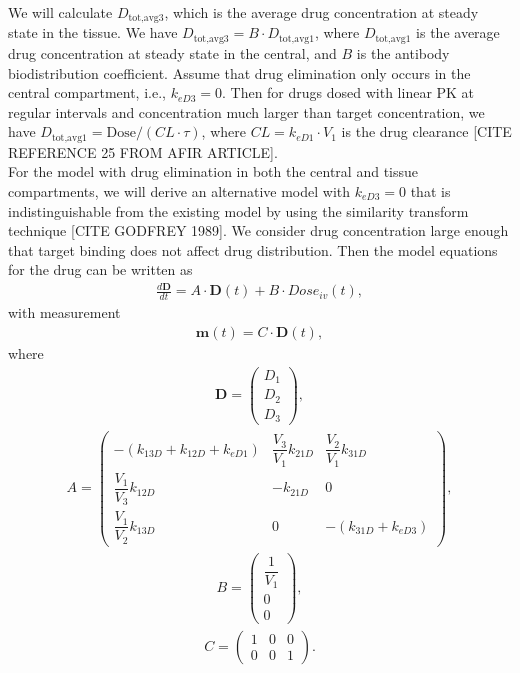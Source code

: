 We will calculate $D_{\text{tot,avg}3}$, which is the average drug concentration at steady state in the tissue. We have $D_{\text{tot,avg}3} = B \cdot D_{\text{tot,avg}1}$, where $D_{\text{tot,avg}1}$ is the average drug concentration at steady state in the central, and $B$ is the antibody biodistribution coefficient. Assume that drug elimination only occurs in the central compartment, i.e., $k_{eD3} = 0$. Then for drugs dosed with linear PK at regular intervals and concentration much larger than target concentration, we have $D_{\text{tot,avg}1} = \text{Dose}/(CL \cdot \tau)$, where $CL = k_{eD1} \cdot V_1$ is the drug clearance [CITE REFERENCE 25 FROM AFIR ARTICLE]. \\

For the model with drug elimination in both the central and tissue compartments, we will derive an alternative model with $k_{eD3} = 0$ that is indistinguishable from the existing model by using the similarity transform technique [CITE GODFREY 1989]. We consider drug concentration large enough that target binding does not affect drug distribution. Then the model equations for the drug can be written as 
\begin{align}
\frac{d\mathbf{D}}{dt} = A \cdot \mathbf{D}(t) + B \cdot Dose_{iv}(t), \label{model matrix}
\end{align}
with measurement
\begin{align}
\mathbf{m}(t) = C \cdot \mathbf{D}(t), \label{measurement matrix}
\end{align}
where
\begin{align}
\mathbf{D} = \begin{pmatrix}
D_1 \\
D_2 \\
D_3
\end{pmatrix},
\end{align}
\begin{align}
A = \begin{pmatrix}
-(k_{13D} + k_{12D} + k_{eD1}) & \dfrac{V_3}{V_1}k_{21D} & \dfrac{V_2}{V_1}k_{31D} \\
\dfrac{V_1}{V_3}k_{12D}        & -k_{21D}                & 0 \\
\dfrac{V_1}{V_2}k_{13D}        & 0                       & -(k_{31D} + k_{eD3})
\end{pmatrix},
\end{align}
\begin{align}
B = \begin{pmatrix}
\dfrac{1}{V_1} \\
0 \\
0
\end{pmatrix},
\end{align}
\begin{align}
C = \begin{pmatrix}
1 & 0 & 0 \\
0 & 0 & 1 
\end{pmatrix}.
\end{align}

